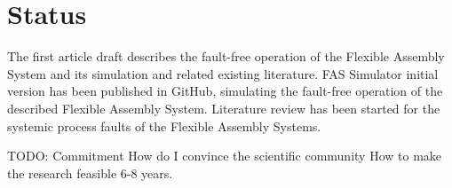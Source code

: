 \documentclass[a4paper,10pt]{article}
\begin{document}
\section{Status}

The first article draft describes the fault-free operation of the Flexible Assembly System and its simulation and related existing literature.
FAS Simulator initial version has been published in GitHub, simulating the fault-free operation of the described Flexible Assembly System.
Literature review has been started for the systemic process faults of the Flexible Assembly Systems.




TODO:
Commitment
How do I convince the scientific community
How to make the research feasible
6-8 years.
\end{document}
